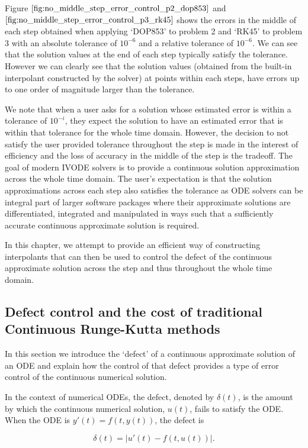 Figure $\ref{fig:no_middle_step_error_control_p2_dop853}$ and $\ref{fig:no_middle_step_error_control_p3_rk45}$ shows the errors in the middle of each step obtained when applying `DOP853' to problem 2 and `RK45' to problem 3 with an absolute tolerance of $10^{-6}$ and a relative tolerance of $10^{-6}$. We can see that the solution values at the end of each step typically satisfy the tolerance. However we can clearly see that the solution values (obtained from the built-in interpolant constructed by the solver) at points within each steps, have errors up to one order of magnitude larger than the tolerance. 

We note that when a user asks for a solution whose estimated error is within a tolerance of $10^{-i}$, they expect the solution to have an estimated error that is within that tolerance for the whole time domain. However, the decision to not satisfy the user provided tolerance throughout the step is made in the interest of efficiency and the loss of accuracy in the middle of the step is the tradeoff. The goal of modern IVODE solvers is to provide a continuous solution approximation across the whole time domain. The user's expectation is that the solution approximations across each step also satisfies the tolerance as ODE solvers can be integral part of larger software packages where their approximate solutions are differentiated, integrated and manipulated in ways such that a sufficiently accurate continuous approximate solution is required. 

In this chapter, we attempt to provide an efficient way of constructing interpolants that can then be used to control the defect of the continuous approximate solution across the step and thus throughout the whole time domain.

\subsection{Defect control and the cost of traditional Continuous Runge-Kutta methods}
\label{section:crk_related_work}
In this section we introduce the `defect' of a continuous approximate solution of an ODE and explain how the control of that defect provides a type of error control of the continuous numerical solution.

In the context of numerical ODEs, the defect, denoted by $\delta(t)$,  is the amount by which the continuous numerical solution, $u(t)$, fails to satisfy the ODE. When the ODE is $y'(t) = f(t, y(t))$, the defect is 

\begin{equation}
\delta(t) = |u'(t) - f(t, u(t))|.
\end{equation}

